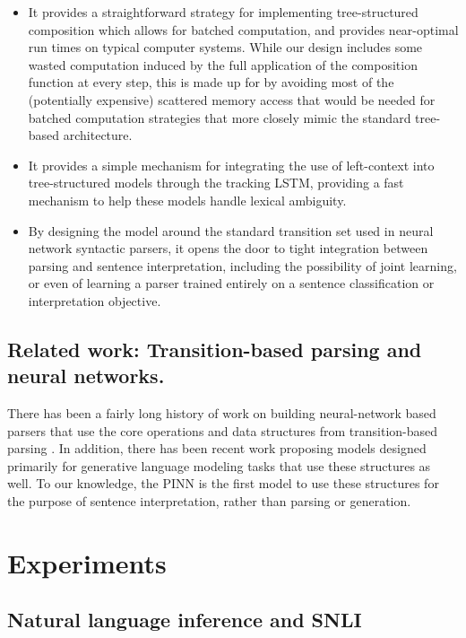 \documentclass[11pt,letterpaper]{article}
\begin{document}
\begin{itemize}
\item It provides a straightforward strategy for implementing tree-structured composition which allows for batched computation, and provides near-optimal run times on typical computer systems. While our design includes some wasted computation induced by the full application of the composition function at every step, this is made up for by avoiding most of the (potentially expensive) scattered memory access that would be needed for batched computation strategies that more closely mimic the standard tree-based architecture.

\item It provides a simple mechanism for integrating the use of left-context into tree-structured models through the tracking LSTM, providing a fast mechanism to help these models handle lexical ambiguity.

\item By designing the model around the standard transition set used in neural network syntactic parsers, it opens the door to tight integration between parsing and sentence interpretation, including the possibility of joint learning, or even of learning a parser trained entirely on a sentence classification or interpretation objective.
\end{itemize}

\subsection{Related work: Transition-based parsing and neural networks.}

There has been a fairly long history of work on building neural-network based parsers that use the core operations and data structures from transition-based parsing \cite{henderson2004discriminative,emami2005neural,titov2010latent,buys2generative,chen2014,dyer-EtAl:2015:ACL-IJCNLP,kiperwasser2016easy}. In addition, there has been recent work \cite{zhang2016top,dyer2016rnn} proposing models designed primarily for generative language modeling tasks that use these structures as well. To our knowledge, the PINN is the first model to use these structures for the purpose of sentence interpretation, rather than parsing or generation.

\section{Experiments}

\subsection{Natural language inference and SNLI}
\end{document}
